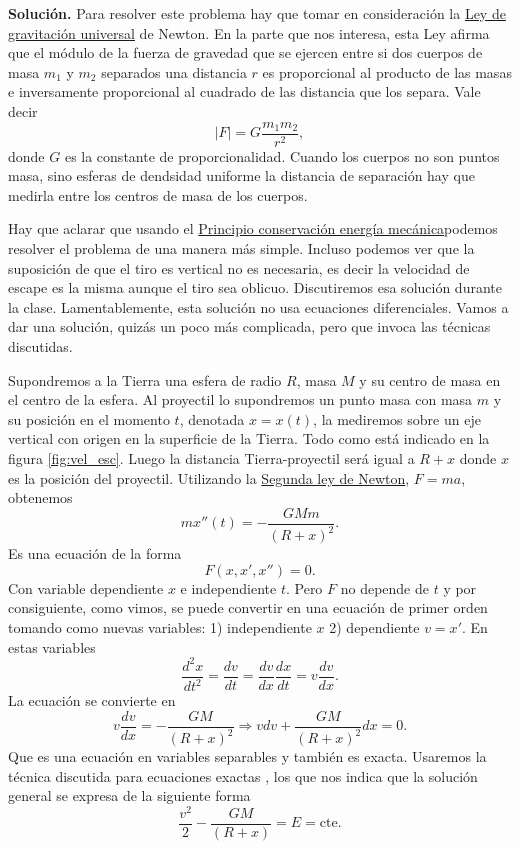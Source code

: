  \noindent\textbf{Solución.} Para resolver este problema hay que tomar en consideración la
\href{http://es.wikipedia.org/wiki/Ley_de_gravitación_universal}{Ley de gravitación universal}\link
de Newton. En la parte que nos interesa, esta Ley afirma
que el módulo de la fuerza de gravedad que se ejercen entre si dos cuerpos de masa $m_1$ y $m_2$ separados una distancia $r$ es proporcional al producto de las masas
e inversamente proporcional al cuadrado de las distancia que los separa. Vale decir
\[|F|=G\frac{m_1m_2}{r^2},\]
donde $G$ es la constante de proporcionalidad.
Cuando los cuerpos no son puntos masa, sino esferas de dendsidad uniforme la distancia de separación hay que medirla entre los centros de masa de los cuerpos.



Hay que aclarar que usando el 
\href{https://docs.google.com/file/d/0B80iJ0HgObRRWll6MlJFSjFNMGc/edit}{Principio conservación energía mecánica}\link\linebreak podemos resolver
el problema de una manera más simple. Incluso podemos ver que la suposición de que el tiro es vertical no es necesaria, es decir la velocidad de escape es la misma aunque
el tiro sea oblicuo. Discutiremos esa solución durante la clase. Lamentablemente,  esta solución no usa ecuaciones diferenciales.
Vamos a dar una solución, quizás un poco más complicada, pero que invoca las técnicas
discutidas.


Supondremos a la Tierra una esfera de radio $R$, masa $M$ y su centro de masa en el centro de la esfera.   Al proyectil lo supondremos un punto masa
con masa $m$ y su posición en el momento $t$, denotada $x=x(t)$, la mediremos sobre un eje vertical con origen en la
superficie de la Tierra.  Todo como está indicado en la figura \ref{fig:vel_esc}.
Luego la distancia Tierra-proyectil será igual a $R+x$ donde $x$ es la posición del proyectil. Utilizando la 
\href{http://es.wikipedia.org/wiki/Leyes_de_Newton\#Segunda_ley_de_Newton_o_ley_de_fuerza}{Segunda ley de Newton},\link
$F=ma$, obtenemos
\[mx''(t)=-\frac{GMm}{(R+x)^2}.\]
Es una ecuación de la forma
\[F(x,x',x'')=0.\]
Con variable dependiente $x$ e independiente $t$. Pero  $F$ no depende de $t$ y por consiguiente, como vimos, se puede convertir en una ecuación de primer orden
tomando como nuevas variables: 1) independiente $x$ 2) dependiente $v=x'$. En estas variables
\[\frac{d^2x}{dt^2}=\frac{dv}{dt}=\frac{dv}{dx}\frac{dx}{dt}=v\frac{dv}{dx}.\]
La ecuación se convierte en
\[v\frac{dv}{dx}=-\frac{GM}{(R+x)^2}\Longrightarrow vdv+\frac{GM}{(R+x)^2}dx=0.\]
Que es una ecuación en variables separables y también es exacta. Usaremos la técnica discutida para
ecuaciones exactas , los que nos indica que la solución general se expresa de la siguiente forma
\begin{equation}\label{energia}
 \frac{v^2}{2}-\frac{GM}{(R+x)}=E=\text{cte}.
\end{equation}


